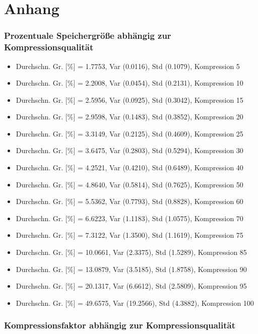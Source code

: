 \part{Anhang}

\section*{Prozentuale Speichergröße abhängig zur Kompressionsqualität}
\begin{itemize}
    \item Durchschn. Gr. [\%] = 1.7753, Var (0.0116), Std (0.1079), Kompression 5
    \item Durchschn. Gr. [\%] = 2.2008, Var (0.0454), Std (0.2131), Kompression 10
    \item Durchschn. Gr. [\%] = 2.5956, Var (0.0925), Std (0.3042), Kompression 15
    \item Durchschn. Gr. [\%] = 2.9598, Var (0.1483), Std (0.3852), Kompression 20
    \item Durchschn. Gr. [\%] = 3.3149, Var (0.2125), Std (0.4609), Kompression 25
    \item Durchschn. Gr. [\%] = 3.6475, Var (0.2803), Std (0.5294), Kompression 30
    \item Durchschn. Gr. [\%] = 4.2521, Var (0.4210), Std (0.6489), Kompression 40
    \item Durchschn. Gr. [\%] = 4.8640, Var (0.5814), Std (0.7625), Kompression 50
    \item Durchschn. Gr. [\%] = 5.5362, Var (0.7793), Std (0.8828), Kompression 60
    \item Durchschn. Gr. [\%] = 6.6223, Var (1.1183), Std (1.0575), Kompression 70
    \item Durchschn. Gr. [\%] = 7.3122, Var (1.3500), Std (1.1619), Kompression 75
    \item Durchschn. Gr. [\%] = 10.0661, Var (2.3375), Std (1.5289), Kompression 85
    \item Durchschn. Gr. [\%] = 13.0879, Var (3.5185), Std (1.8758), Kompression 90
    \item Durchschn. Gr. [\%] = 20.1317, Var (6.6612), Std (2.5809), Kompression 95
    \item Durchschn. Gr. [\%] = 49.6575, Var (19.2566), Std (4.3882), Kompression 100
\end{itemize}


\newpage
\section*{Kompressionsfaktor abhängig zur Kompressionsqualität}

